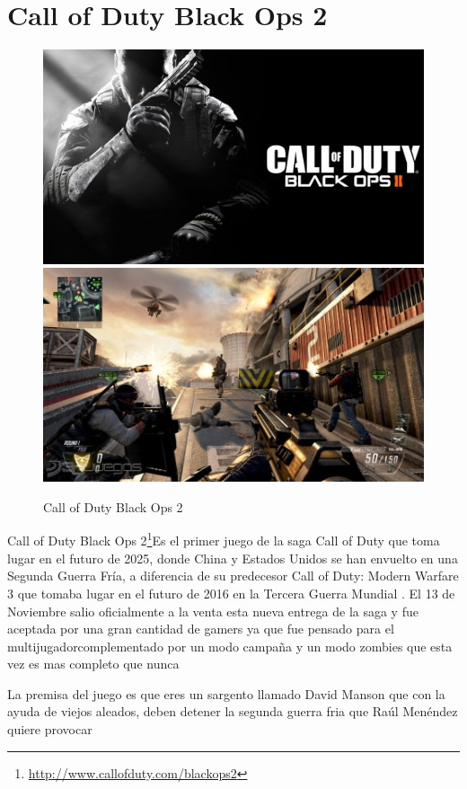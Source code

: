 \section{Call of Duty Black Ops 2}

\begin{figure}[htbp]
\begin{center}
\includegraphics[width=.60\textwidth]{./imagenes/black.jpg}
\includegraphics[width=.60\textwidth]{./imagenes/black2.jpg}
\caption{Call of Duty Black Ops 2}
\label{Call of Duty Black Ops 2}
\end{center}
\end{figure}
Call of Duty Black Ops 2\footnote{\url{http://www.callofduty.com/blackops2}}Es el primer juego de la saga Call of Duty que toma lugar en el futuro de 2025, donde China y Estados Unidos se han envuelto en una Segunda Guerra Fría, a diferencia de su predecesor Call of Duty: Modern Warfare 3 que tomaba lugar en el futuro de 2016 en la Tercera Guerra Mundial . El 13 de Noviembre salio  oficialmente a la venta esta nueva entrega de la saga y fue aceptada por una gran cantidad de gamers ya que fue pensado para el multijugadorcomplementado por un modo campaña y un modo zombies que esta vez es mas completo que nunca

La premisa del juego es que eres un sargento llamado David Manson que con la ayuda de viejos aleados, deben detener la segunda guerra fria que Raúl Menéndez quiere provocar

